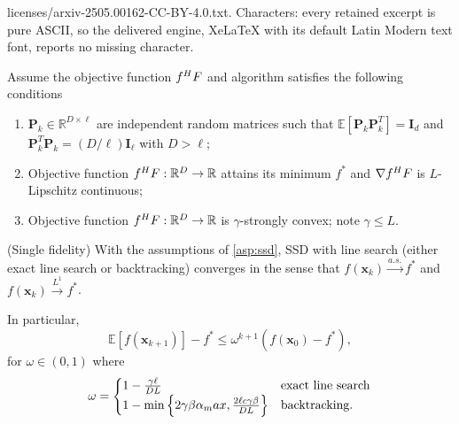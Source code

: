 \documentclass[10pt,a4paper]{amsart}
\def\R{{\mathbb R}}
\newcommand{\HF}{\textup{HF}}
\newcommand{\Lip}{L}
\newcommand{\alphaMax}{\alpha_\textup{max}}
\begin{document}
licenses/arxiv-2505.00162-CC-BY-4.0.txt. Characters: every retained excerpt is pure ASCII, so the delivered engine, XeLaTeX with its default Latin Modern text font, reports no missing character.
\begin{assumption}
\label{asp:ssd}
Assume the objective function $f^\HF$ and algorithm satisfies the following conditions
\begin{enumerate}
    \item $\bm P_k\in\R^{D\times\ell}$ are independent random matrices such that $\mathbb{E}[\bm P_k\bm P_k^T] = \bm I_d$ and $\bm P_k^T\bm P_k = (D/\ell)\bm I_\ell$ with $D>\ell$;
    \item Objective function $f^\HF:\R^D\to\R$ attains its minimum $f^*$ and $\nabla f^\HF$ is $\Lip$-Lipschitz continuous;
    \item Objective function $f^\HF:\R^D\to\R$ is $\gamma$-strongly convex; note $\gamma \le \Lip$.
\end{enumerate}
\end{assumption}

\begin{theorem}
\label{thm:sf-sc}
(Single fidelity) With the assumptions of \ref{asp:ssd},  SSD with line search (either exact line search or backtracking) converges in the sense that $f(\bm x_k)\overset{a.s.}{\to}f^*$ and $f(\bm x_k)\overset{L^1}{\to}f^*$.

In particular,
\begin{equation}
\mathbb{E}[f(\bm x_{k+1})] - f^* \leq  \omega^{k+1}(f(\bm{x}_0) - f^*),
\end{equation}
for $\omega\in(0,1)$ where
\begin{align*}
\omega = \begin{cases} 1-\frac{\gamma\ell}{D\Lip} & \text{exact line search} \\
1-\min\left\{2\gamma\beta \alphaMax,\frac{2\ell c\gamma\beta}{D\Lip}\right\} & \text{backtracking}.
\end{cases}
\end{align*}


\end{theorem}
\end{document}
